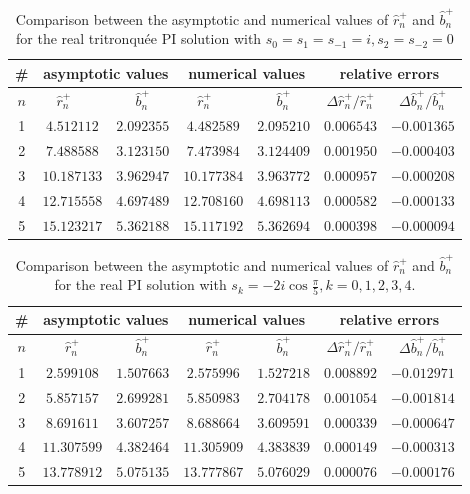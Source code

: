 \documentclass[12pt]{article}
\theoremstyle{plain}
\theoremstyle{definition}
\numberwithin{equation}{section}
\begin{document}
\begin{table}[htp]
  \centering
  \caption{Comparison between the asymptotic and numerical values of $\hat{r}_{n}^{+}$ and $\hat{b}_{n}^{+}$ for the real tritronqu\'{e}e PI solution with $s_{0}=s_{1}=s_{-1}=i, s_{2}=s_{-2}=0$}\label{table-comparison-rn-bn-type-A}
  \begin{tabular}{c|cc|cc|cc}
  \toprule
\#	&   \multicolumn{2}{c|}{asymptotic values}		&\multicolumn{2}{c|}{numerical values} 	& \multicolumn{2}{c}{relative  errors}   \\
\midrule
$n$	& $\hat{r}_{n}^{+}\quad~$ & $\hat{b}_{n}^{+}$		& $\hat{r}_{n}^{+}\quad~$	& $\hat{b}_{n}^{+}$		& $\Delta \hat{r}_{n}^{+}/\hat{r}_{n}^{+}$  		& $\Delta \hat{b}_{n}^{+}/\hat{b}_{n}^{+}$	  \\
\hline
 1	& $ 4.512112$ & $2.092355$ & $ 4.482589 $ & $2.095210$ & $0.006543$	& $-0.001365$\\
 2	& $ 7.488588$ & $3.123150$ & $ 7.473984$ & $3.124409$ & $0.001950$	& $-0.000403$\\
 3	& $ 10.187133$ & $3.962947$ & $ 10.177384$ & $3.963772$ & $0.000957$	& $-0.000208$\\
 4	& $12.715558$ & $4.697489$ & $12.708160$ & $4.698113$ & $0.000582$	& $-0.000133$\\
 5	& $15.123217$ & $5.362188$	& $15.117192$ & $5.362694$ & $0.000398$	& $-0.000094$\\
\bottomrule
  \end{tabular}
\end{table}


\begin{table}[htp]
  \centering
  \caption{Comparison between the asymptotic and numerical values of $\hat{r}_{n}^{+}$ and $\hat{b}_{n}^{+}$ for the real PI solution with $s_{k}=-2i\cos{\frac{\pi}{5}}, k=0,1,2,3,4$.}\label{table-comparison-rn-bn-type-C}
  \begin{tabular}{c|cc|cc|cc}
  \toprule
\#	&   \multicolumn{2}{c|}{asymptotic values}		&\multicolumn{2}{c|}{numerical values} 	& \multicolumn{2}{c}{relative  errors}   \\
\midrule
$n$	& $\hat{r}_{n}^{+}$ & $\hat{b}_{n}^{+}$		& $\hat{r}_{n}^{+}$	& $\hat{b}_{n}^{+}$		& $\Delta \hat{r}_{n}^{+}/\hat{r}_{n}^{+}$  		& $\Delta \hat{b}_{n}^{+}/\hat{b}_{n}^{+}$	\\ \hline
 1	& $ 2.599108$ & $1.507663$ & $ 2.575996$ & $1.527218$ & $0.008892$	& $-0.012971$\\
 2	& $ 5.857157$ & $2.699281$ & $ 5.850983$ & $2.704178$ & $0.001054$	& $-0.001814$\\
 3	& $ 8.691611$ & $3.607257$ & $ 8.688664$ & $3.609591$ & $0.000339$	& $-0.000647$\\
 4	& $11.307599$ & $4.382464$ & $11.305909$ & $4.383839$ & $0.000149$	& $-0.000313$\\
 5	& $13.778912$ & $5.075135$	& $13.777867$ & $5.076029$ & $0.000076$	& $-0.000176$\\
\bottomrule
  \end{tabular}
\end{table}
\end{document}
